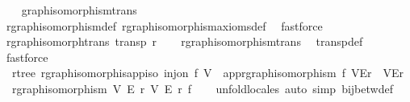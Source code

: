 \begin{isabellebody}
%
\isadelimproof
\ \ %
\endisadelimproof
%
\isatagproof
{}\isamarkupfalse%
\ graph{\isacharunderscore}{\kern0pt}isomorphism{\isacharunderscore}{\kern0pt}trans\ \isamarkupfalse%
\ rgraph{\isacharunderscore}{\kern0pt}isomorphism{\isacharunderscore}{\kern0pt}def\ rgraph{\isacharunderscore}{\kern0pt}isomorphism{\isacharunderscore}{\kern0pt}axioms{\isacharunderscore}{\kern0pt}def\ \isamarkupfalse%
\ fastforce%
\endisatagproof
{\isafoldproof}%
%
\isadelimproof
\isanewline
%
\endisadelimproof
\isanewline
{}\isamarkupfalse%
\ rgraph{\isacharunderscore}{\kern0pt}isomorph{\isacharunderscore}{\kern0pt}trans{\isacharcolon}{\kern0pt}\ {\isachardoublequoteopen}transp\ {\isacharparenleft}{\kern0pt}{\isasymsimeq}\isactrlsub r{\isacharparenright}{\kern0pt}{\isachardoublequoteclose}\isanewline
%
\isadelimproof
\ \ %
\endisadelimproof
%
\isatagproof
{}\isamarkupfalse%
\ rgraph{\isacharunderscore}{\kern0pt}isomorphism{\isacharunderscore}{\kern0pt}trans\ \isamarkupfalse%
\ transp{\isacharunderscore}{\kern0pt}def\ \isamarkupfalse%
\ fastforce%
\endisatagproof
{\isafoldproof}%
%
\isadelimproof
\isanewline
%
\endisadelimproof
\isanewline
{}\isamarkupfalse%
\ {\isacharparenleft}{\kern0pt}\ rtree{\isacharparenright}{\kern0pt}\ rgraph{\isacharunderscore}{\kern0pt}isomorphis{\isacharunderscore}{\kern0pt}app{\isacharunderscore}{\kern0pt}iso{\isacharcolon}{\kern0pt}\ {\isachardoublequoteopen}inj{\isacharunderscore}{\kern0pt}on\ f\ V\ {\isasymLongrightarrow}\ app{\isacharunderscore}{\kern0pt}rgraph{\isacharunderscore}{\kern0pt}isomorphism\ f\ {\isacharparenleft}{\kern0pt}V{\isacharcomma}{\kern0pt}E{\isacharcomma}{\kern0pt}r{\isacharparenright}{\kern0pt}\ {\isacharequal}{\kern0pt}\ {\isacharparenleft}{\kern0pt}V{\isacharprime}{\kern0pt}{\isacharcomma}{\kern0pt}E{\isacharprime}{\kern0pt}{\isacharcomma}{\kern0pt}r{\isacharprime}{\kern0pt}{\isacharparenright}{\kern0pt}\ {\isasymLongrightarrow}\ rgraph{\isacharunderscore}{\kern0pt}isomorphism\ V\ E\ r\ V{\isacharprime}{\kern0pt}\ E{\isacharprime}{\kern0pt}\ r{\isacharprime}{\kern0pt}\ f{\isachardoublequoteclose}\isanewline
%
\isadelimproof
\ \ %
\endisadelimproof
%
\isatagproof
{}\isamarkupfalse%
\ unfold{\isacharunderscore}{\kern0pt}locales\ {\isacharparenleft}{\kern0pt}auto\ simp{\isacharcolon}{\kern0pt}\ bij{\isacharunderscore}{\kern0pt}betw{\isacharunderscore}{\kern0pt}def{\isacharparenright}{\kern0pt}%
\endisatagproof
{\isafoldproof}%
%
\isadelimproof
\isanewline
%
\endisadelimproof

\end{isabellebody}
